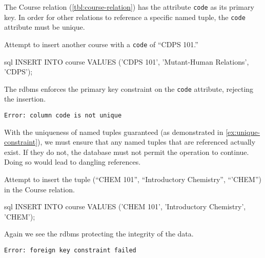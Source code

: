 			The Course relation (\vref{tbl:course-relation}) has the attribute \texttt{code} as its primary key.	In order for other relations to reference a specific named tuple, the \texttt{code} attribute must be unique.
			
			\begin{ex}
			\label{ex:unique-constraint}
				Attempt to insert another course with a \texttt{code} of ``CDPS 101.''
				
				\begin{singlespaced}
					\begin{pygments}{sql}
INSERT INTO course
VALUES      ('CDPS 101',
             'Mutant-Human Relations',
             'CDPS');
					\end{pygments}
				\end{singlespaced}
				
				The \gls{rdbms} enforces the primary key constraint on the \texttt{code} attribute, rejecting the insertion.
				
				\begin{verbatim}
Error: column code is not unique
				\end{verbatim}
			\end{ex}
			
			With the uniqueness of named tuples guaranteed (as demonstrated in \vref{ex:unique-constraint}), we must ensure that any named tuples that are referenced actually exist.  If they do not, the database must not permit the operation to continue.  Doing so would lead to dangling references.
			
			\begin{ex}
				Attempt to insert the tuple (``CHEM 101'', ``Introductory Chemistry'', ``'CHEM'') in the Course relation.
				
				\begin{singlespaced}
					\begin{pygments}{sql}
INSERT INTO course
VALUES      ('CHEM 101',
             'Introductory Chemistry',
             'CHEM');
					\end{pygments}
				\end{singlespaced}
				
				Again we see the \gls{rdbms} protecting the integrity of the data.
				
				\begin{verbatim}
Error: foreign key constraint failed
				\end{verbatim}
			\end{ex}
			
